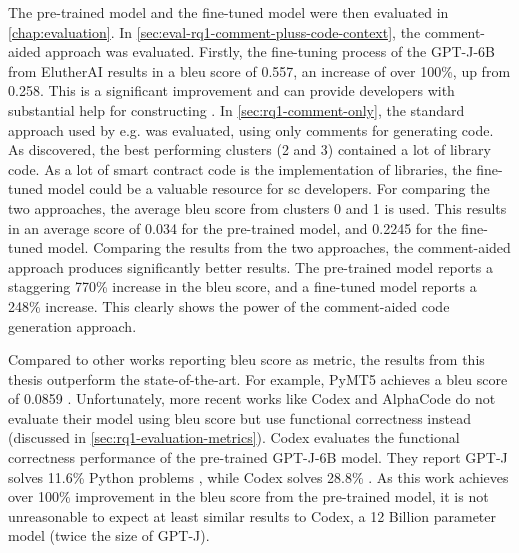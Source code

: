 The pre-trained model and the fine-tuned model were then evaluated in \cref{chap:evaluation}. In \cref{sec:eval-rq1-comment-pluss-code-context}, the comment-aided approach was evaluated. Firstly, the fine-tuning process of the GPT-J-6B from ElutherAI results in a \acrshort{bleu} score of 0.557, an increase of over 100\%, up from 0.258. This is a significant improvement and can provide developers with substantial help for constructing . In \cref{sec:rq1-comment-only}, the standard approach used by e.g.  was evaluated, using only comments for generating code. As discovered, the best performing clusters (2 and 3) contained a lot of library code. As a lot of smart contract code is the implementation of libraries, the fine-tuned model could be a valuable resource for \acrshort{sc} developers. For comparing the two approaches, the average \acrshort{bleu} score from clusters 0 and 1 is used. This results in an average score of 0.034 for the pre-trained model, and 0.2245 for the fine-tuned model. Comparing the results from the two approaches, the comment-aided approach produces significantly better results. The pre-trained model reports a staggering 770\% increase in the \acrshort{bleu} score, and a fine-tuned model reports a 248\% increase. This clearly shows the power of the comment-aided code generation approach.


Compared to other works reporting \acrshort{bleu} score as metric, the results from this thesis outperform the state-of-the-art. For example, PyMT5 achieves a bleu score of 0.0859 \cite{colin2020pymt5}. Unfortunately, more recent works like Codex and AlphaCode do not evaluate their model using \acrshort{bleu} score but use functional correctness instead (discussed in \cref{sec:rq1-evaluation-metrics}). Codex evaluates the functional correctness performance of the pre-trained GPT-J-6B model. They report GPT-J solves 11.6\% Python problems \cite{chen2021codex}, while Codex solves 28.8\% \cite{chen2021codex}. As this work achieves over 100\% improvement in the \acrshort{bleu} score from the pre-trained model, it is not unreasonable to expect at least similar results to Codex, a 12 Billion parameter model (twice the size of GPT-J). 



